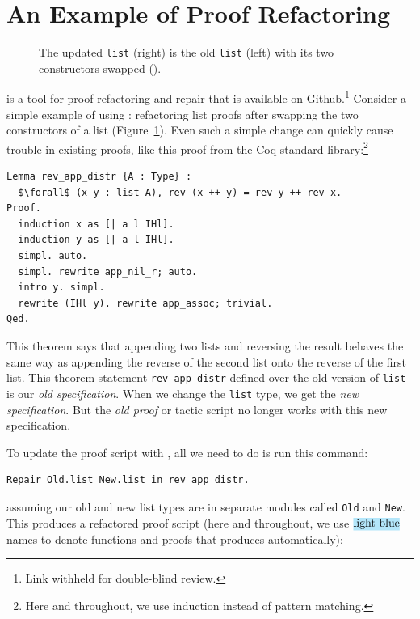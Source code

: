 \section{An Example of Proof Refactoring}
\label{sec:overview}

\begin{figure}
\begin{minipage}{0.46\textwidth}
   
\end{minipage}
\hfill
\begin{minipage}{0.46\textwidth}
   
\end{minipage}
\caption{The updated \lstinline{list} (right) is the old \lstinline{list} (left) with its two constructors swapped ().}
\label{fig:listswap}
\end{figure}

\toolname is a tool for proof refactoring and repair that is available on Github.\footnote{Link withheld for double-blind review.}
Consider a simple example of using \toolname: refactoring list proofs after swapping the two constructors of a list (Figure~\ref{fig:listswap}).
Even such a simple change can quickly cause trouble in existing proofs, like this proof from the Coq standard library:\footnote{Here and throughout, we use induction instead of pattern matching.}

\begin{lstlisting}
Lemma rev_app_distr {A : Type} :
  $\forall$ (x y : list A), rev (x ++ y) = rev y ++ rev x.
Proof.
  induction x as [| a l IHl].
  induction y as [| a l IHl].
  simpl. auto.
  simpl. rewrite app_nil_r; auto.
  intro y. simpl.
  rewrite (IHl y). rewrite app_assoc; trivial.
Qed.
\end{lstlisting}
This theorem says that appending two lists and reversing the result behaves the same way as appending
the reverse of the second list onto the reverse of the first list.
This theorem statement \lstinline{rev_app_distr} defined over the old version of \lstinline{list} is our \textit{old specification}.
When we change the \lstinline{list} type, we get the \textit{new specification}.
But the \textit{old proof} or tactic script no longer works with this new specification.

To update the proof script with \toolname, all we need to do is run this command:

\begin{lstlisting}
Repair Old.list New.list in rev_app_distr.
\end{lstlisting}
assuming our old and new list types are in separate modules called \lstinline{Old} and \lstinline{New}.
This produces a refactored proof script (here and throughout, we use $\codeauto{light blue}$ names to denote
functions and proofs that \toolname produces automatically):

